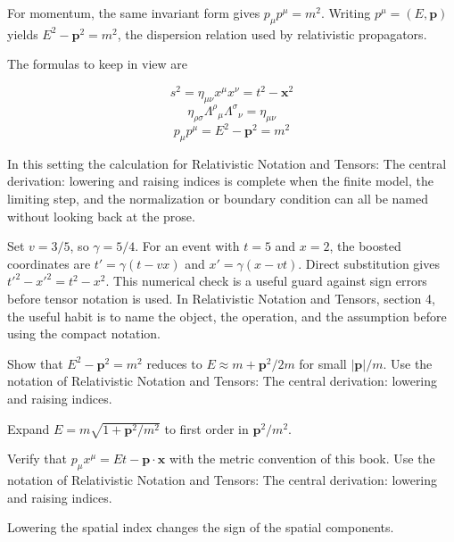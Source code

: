 For momentum, the same invariant form gives \(p_\mu p^\mu=m^2\).  Writing \(p^\mu=(E,\bm p)\) yields \(E^2-\bm p^2=m^2\), the dispersion relation used by relativistic propagators.

The formulas to keep in view are

\[
  s^2=\eta_{\mu\nu}x^\mu x^\nu=t^2-\bm x^2
\]
\[
  \eta_{\rho\sigma}\Lambda^\rho{}_\mu\Lambda^\sigma{}_\nu=\eta_{\mu\nu}
\]
\[
  p_\mu p^\mu=E^2-\bm p^2=m^2
\]

In this setting the calculation for Relativistic Notation and Tensors: The central derivation: lowering and raising indices is complete when the finite model, the limiting step, and the normalization or boundary condition can all be named without looking back at the prose.




\begin{example}
Set \(v=3/5\), so \(\gamma=5/4\).  For an event with \(t=5\) and \(x=2\), the boosted coordinates are \(t'=\gamma(t-vx)\) and \(x'=\gamma(x-vt)\).  Direct substitution gives \(t'^2-x'^2=t^2-x^2\).  This numerical check is a useful guard against sign errors before tensor notation is used.  In Relativistic Notation and Tensors, section 4, the useful habit is to name the object, the operation, and the assumption before using the compact notation.
\end{example}



\begin{exercise}
Show that \(E^2-\bm p^2=m^2\) reduces to \(E\approx m+\bm p^2/2m\) for small \(|\bm p|/m\).  Use the notation of Relativistic Notation and Tensors: The central derivation: lowering and raising indices.
\begin{answer}
Expand \(E=m\sqrt{1+\bm p^2/m^2}\) to first order in \(\bm p^2/m^2\).
\end{answer}
\end{exercise}

\begin{exercise}
Verify that \(p_\mu x^\mu=Et-\bm p\cdot\bm x\) with the metric convention of this book.  Use the notation of Relativistic Notation and Tensors: The central derivation: lowering and raising indices.
\begin{answer}
Lowering the spatial index changes the sign of the spatial components.
\end{answer}
\end{exercise}



